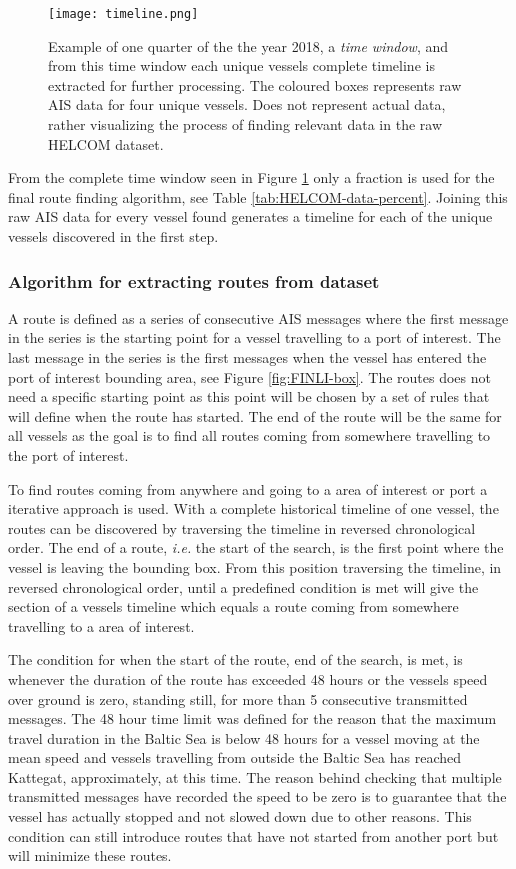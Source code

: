 \documentclass[../main.tex]{subfiles}
\begin{document}
\begin{figure}[H]
	\centering
	\texttt{[image: timeline.png]}
	\caption{Example of one quarter of the the year 2018, a \textit{time window}, and from this time window each unique vessels complete timeline is extracted for further processing. The coloured boxes represents raw AIS data for four unique vessels. Does not represent actual data, rather visualizing the process of finding relevant data in the raw HELCOM dataset.}
	\label{fig:timeline}
\end{figure}

From the complete time window seen in Figure \ref{fig:timeline} only a fraction is used for the final route finding algorithm, see Table \ref{tab:HELCOM-data-percent}. Joining this raw AIS data for every vessel found generates a timeline for each of the unique vessels discovered in the first step.

\subsubsection{Algorithm for extracting routes from dataset}
\label{sec:algo-section}
A route is defined as a series of consecutive AIS messages where the first message in the series is the starting point for a vessel travelling to a port of interest. The last message in the series is the first messages when the vessel has entered the port of interest bounding area, see Figure \ref{fig:FINLI-box}. The routes does not need a specific starting point as this point will be chosen by a set of rules that will define when the route has started. The end of the route will be the same for all vessels as the goal is to find all routes coming from somewhere travelling to the port of interest.

To find routes coming from anywhere and going to a area of interest or port a iterative approach is used. With a complete historical timeline of one vessel, the routes can be discovered by traversing the timeline in reversed chronological order. The end of a route, \textit{i.e.} the start of the search, is the first point where the vessel is leaving the bounding box. From this position traversing the timeline, in reversed chronological order, until a predefined condition is met will give the section of a vessels timeline which equals a route coming from somewhere travelling to a area of interest.

The condition for when the start of the route, end of the search, is met, is whenever the duration of the route has exceeded 48 hours or the vessels speed over ground is zero, standing still, for more than 5 consecutive transmitted messages. The 48 hour time limit was defined for the reason that the maximum travel duration in the Baltic Sea is below 48 hours for a vessel moving at the mean speed and vessels travelling from outside the Baltic Sea has reached Kattegat, approximately, at this time. The reason behind checking that multiple transmitted messages have recorded the speed to be zero is to guarantee that the vessel has actually stopped and not slowed down due to other reasons. This condition can still introduce routes that have not started from another port but will minimize these routes.
\end{document}
